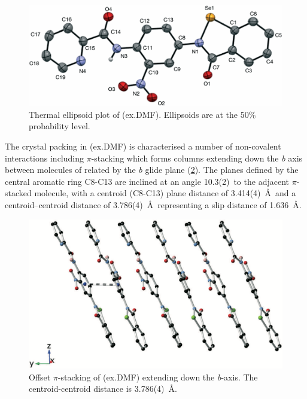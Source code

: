 \begin{refsection}
\begin{figure}
    \centering
    \includegraphics[width=0.8\linewidth]{Figures/ebs-nitroamide-2py-dmf-xtal.pdf}
    \caption{Thermal ellipsoid plot of (ex.DMF). Ellipsoids are at the 50\% probability level.}
    \label{fig:ebs-nitroamide-2py-dmf-xtal}
\end{figure}

The crystal packing in (ex.DMF) is characterised a number of non-covalent interactions including $\pi$-stacking which forms columns extending down the \emph{b} axis between molecules of  related by the \emph{b} glide plane (\cref{fig:ebs-nitroamide-2py-packing}).
The planes defined by the central aromatic ring C8-C13 are inclined at an angle 10.3(2)\degree~to the adjacent $\pi$-stacked molecule, with a centroid (C8-C13) plane distance of 3.414(4)~\AA~and a centroid–centroid distance of 3.786(4)~\AA~representing a slip distance of 1.636~\AA.

\begin{figure}
    \centering
    \includegraphics[width=0.8\linewidth]{Figures/ebs-nitroamide-2py-packing.pdf}
    \caption{Offset $\pi$-stacking of (ex.DMF) extending down the \emph{b}-axis. The centroid-centroid distance is 3.786(4)~\AA.}
    \label{fig:ebs-nitroamide-2py-packing}
\end{figure}


\end{refsection}
